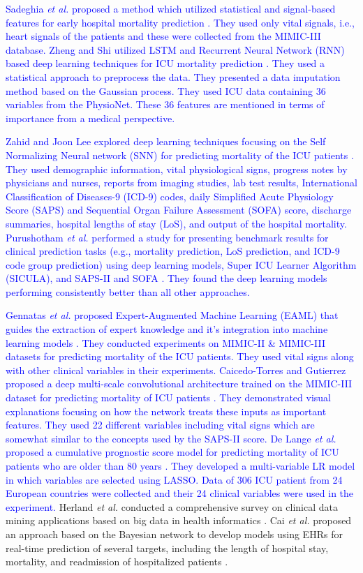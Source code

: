 \textcolor{blue}{Sadeghia \textit{et al.} proposed a method which utilized statistical and signal-based features for early hospital mortality prediction \cite{Sadeghi2018}. They used only vital signals, i.e., heart signals of the patients and these were collected from the MIMIC-III database. Zheng and Shi utilized LSTM and Recurrent Neural Network (RNN) based deep learning techniques for ICU mortality prediction \cite{Zheng2018}. They used a statistical approach to preprocess the data. They presented a data imputation method based on the Gaussian process. They used ICU data containing 36 variables from the PhysioNet. These 36 features are mentioned in terms of importance from a medical perspective.} 

\textcolor{blue}{Zahid and Joon Lee explored deep learning techniques focusing on the Self Normalizing Neural network (SNN) for predicting mortality of the ICU patients \cite{Zahid2018}. They used demographic information, vital physiological signs, progress notes by physicians and nurses, reports from imaging studies, lab test results, International Classification of Diseases-9 (ICD-9) codes, daily Simplified Acute Physiology Score (SAPS) and Sequential Organ Failure Assessment (SOFA) score, discharge summaries, hospital lengths of stay (LoS), and output of the hospital mortality. Purushotham \textit{et al.} performed a study for presenting benchmark results for clinical prediction tasks (e.g., mortality prediction, LoS prediction, and ICD-9 code group prediction) using deep learning models, Super ICU Learner Algorithm (SICULA), and SAPS-II and SOFA \cite{Purushotham2018}. They found the deep learning models performing consistently better than all other approaches.} 

\textcolor{blue}{Gennatas \textit{et al.} proposed Expert-Augmented Machine Learning (EAML) that guides the extraction of expert knowledge and it's integration into machine learning models \cite{Gennatas2019}. They conducted experiments on MIMIC-II \& MIMIC-III datasets for predicting mortality of the ICU patients. They used vital signs along with other clinical variables in their experiments. Caicedo-Torres and Gutierrez proposed a deep multi-scale convolutional architecture trained on the MIMIC-III dataset for predicting mortality of ICU patients \cite{Torres2019}. They demonstrated visual explanations focusing on how the network treats these inputs as important features. They used 22 different variables including vital signs which are somewhat similar to the concepts used by the SAPS-II score. De Lange \textit{et al.} proposed a cumulative prognostic score model for predicting mortality of ICU patients who are older than 80 years \cite{Lange2019}. They developed a multi-variable LR model in which variables are selected using LASSO. Data of 306 ICU patient from 24 European countries were collected and their 24 clinical variables were used in the experiment.} Herland \textit{et al.} conducted a comprehensive survey on clinical data mining applications based on big data in health informatics \cite{Herland}. Cai \textit{et al.}  proposed an approach based on the Bayesian network to develop models using EHRs for real-time prediction of several targets, including the length of hospital stay, mortality, and readmission of hospitalized patients \cite{Cai:2016}.

